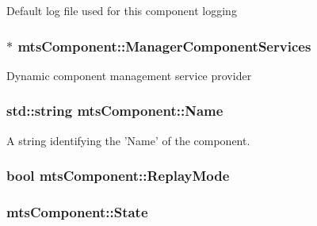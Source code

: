 Default log file used for this component logging \hypertarget{classmts_component_ae405a53b19cda763738c768fc2e6d5b9}{
\subsubsection[{Manager\-Component\-Services}]{$\ast$ mts\-Component\-::\-Manager\-Component\-Services\hspace{0.3cm}{\ttfamily [protected]}}}\label{classmts_component_ae405a53b19cda763738c768fc2e6d5b9}
Dynamic component management service provider \hypertarget{classmts_component_a506cd73bf8afc8286ddf8d933b1b1658}{
\subsubsection[{Name}]{\setlength{\rightskip}{0pt plus 5cm}std\-::string mts\-Component\-::\-Name\hspace{0.3cm}{\ttfamily [protected]}}}\label{classmts_component_a506cd73bf8afc8286ddf8d933b1b1658}
A string identifying the 'Name' of the component. \hypertarget{classmts_component_a1415d1093295a997b52d7c9d026fb5cc}{
\subsubsection[{Replay\-Mode}]{\setlength{\rightskip}{0pt plus 5cm}bool mts\-Component\-::\-Replay\-Mode\hspace{0.3cm}{\ttfamily [protected]}}}\label{classmts_component_a1415d1093295a997b52d7c9d026fb5cc}
\hypertarget{classmts_component_ac5352257c71985bc22cfa81e87f7f445}{
\subsubsection[{State}]{ mts\-Component\-::\-State\hspace{0.3cm}{\ttfamily [protected]}}}\label{classmts_component_ac5352257c71985bc22cfa81e87f7f445}
